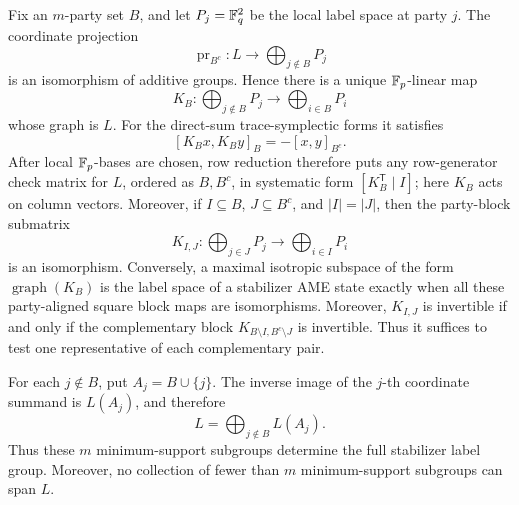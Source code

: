 \begin{proposition}
\label{prop:half-set-direct-sum}
Fix an \(m\)-party set \(B\), and let \(P_j=\mathbb F_q^2\) be the local label
space at party \(j\).  The coordinate projection
\[
 \operatorname{pr}_{B^c}:L\longrightarrow
 \bigoplus_{j\notin B}P_j
\]
is an isomorphism of additive groups.  Hence there is a unique
\(\mathbb F_p\)-linear map
\[
 K_B:\bigoplus_{j\notin B}P_j\longrightarrow
     \bigoplus_{i\in B}P_i
\]
whose graph is \(L\).  For the direct-sum trace-symplectic forms it
satisfies
\[
 [K_Bx,K_By]_B=-[x,y]_{B^c}.
\]
After local \(\mathbb F_p\)-bases are chosen, row reduction therefore puts any
row-generator check matrix for \(L\), ordered as \(B,B^c\), in systematic
form \([K_B^{\mathsf T}\mid I]\); here \(K_B\) acts on column vectors.
Moreover, if \(I\subseteq B\), \(J\subseteq B^c\), and
\(|I|=|J|\), then the party-block submatrix
\[
 K_{I,J}:\bigoplus_{j\in J}P_j\longrightarrow
          \bigoplus_{i\in I}P_i
\]
is an isomorphism.
Conversely, a maximal isotropic subspace of the form
\(\operatorname{graph}(K_B)\) is the label space of a stabilizer AME state
exactly when all these party-aligned square block maps are isomorphisms.
Moreover, \(K_{I,J}\) is invertible if and only if the complementary block
\(K_{B\setminus I,B^c\setminus J}\) is invertible.  Thus it suffices to test
one representative of each complementary pair.

For each \(j\notin B\), put
\(A_j=B\cup\{j\}\).  The inverse image of the \(j\)-th coordinate
summand is \(L(A_j)\), and therefore
\[
 L=\bigoplus_{j\notin B}L(A_j).
\]
Thus these \(m\) minimum-support subgroups determine the full stabilizer
label group.  Moreover, no collection of fewer than \(m\)
minimum-support subgroups can span \(L\).
\end{proposition}

